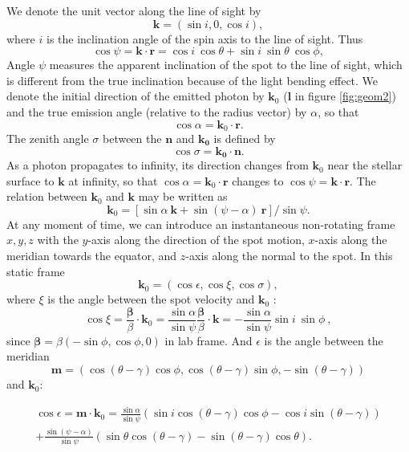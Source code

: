 \documentclass{wihuri}
\def\be{\begin{equation}}
\def\ee{\end{equation}}
\newcommand{\bmath}[1]{\boldsymbol{#1}}
\begin{document}
We denote the unit vector along the line of sight by 
\be
\bmath{k}=(\sin i, 0, \cos i), 
\ee 
where $i$ is the inclination angle of the spin axis to the line of sight. 
Thus 
\be \label{eq:psi2}
  \cos\psi=\bmath{k}\cdot \bmath{r} = \cos i\ \cos\theta+\sin i\ \sin \theta\ \cos\phi,
\ee
Angle $\psi$ measures the apparent inclination of the spot to the line of
sight, which is different from the true inclination because of
the light bending effect. %
We denote the initial direction of the emitted photon by $\bmath{k}_0$ ($\bmath{l}$ in figure \ref{fig:geom2})
and the true emission angle (relative to the radius vector) by $\alpha$, so that
\be
 \cos\alpha=\bmath{k}_0 \cdot \bmath{r}.
\ee
The zenith angle $\sigma$ between the $\bmath{n}$ and $\bmath{k_{0}}$ is defined by 
\be
\cos\sigma = \bmath{k_{0}}\cdot\bmath{n}.
\ee
As a photon propagates to infinity, its direction changes from
$\bmath{k}_0$ near the stellar surface to $\bmath{k}$ at infinity,
so that $\cos\alpha=\bmath{k}_0\cdot\bmath{r}$
changes to $\cos\psi=\bmath{k}\cdot\bmath{r}$.
The relation between $\bmath{k}_0$ and $\bmath{k}$ may be written as
\be\label{eq:k02}
\bmath{k}_0=[ \sin\alpha\ \bmath{k} +\sin(\psi-\alpha)\ \bmath{r}]/\sin\psi.
\ee
At any moment of time, we can introduce an instantaneous non-rotating frame $x,y,z$ 
with the $y$-axis along the direction of the spot motion, 
$x$-axis along the meridian towards the equator, and 
$z$-axis along the normal  to the spot.
In this static frame 
\be 
\bmath{k}_0=
\left( 
\cos \epsilon,
\cos\xi, 
\cos\sigma
\right) ,
\ee 
where $\xi$ is the angle  between the spot velocity and $\bmath{k}_0$ :   
\be \label{eq:cosxi22}
\cos\xi=\frac{\bmath{\beta}}{\beta} \cdot \bmath{k}_0
=\frac{\sin\alpha}{\sin\psi} \frac{\bmath{\beta}}{\beta} \cdot \bmath{k}=
- \frac{\sin\alpha}{\sin\psi}\sin i\ \sin\phi\ ,
\ee
since $\bmath{\beta} = \beta(-\sin\phi,\cos\phi,0)$ in lab frame. And $\epsilon$ is the angle between the meridian 
\be
 \bmath{m} = (\cos(\theta - \gamma)\cos \phi ,\cos (\theta -\gamma)\sin \phi, -\sin (\theta -\gamma))
\ee
and $\bmath{k}_0$: 

\be \label{eq:kx-comp}
\begin{split}
\cos\epsilon= \bmath{m} \cdot \bmath{k}_0
=\frac{\sin\alpha}{\sin\psi} (\sin i \cos(\theta -\gamma)\cos \phi -\cos i \sin (\theta -\gamma)) \\ + \frac{\sin (\psi - \alpha)}{\sin \psi}(\sin \theta \cos (\theta -\gamma)-\sin (\theta -\gamma)\cos \theta).
\end{split}
\ee
\end{document}
